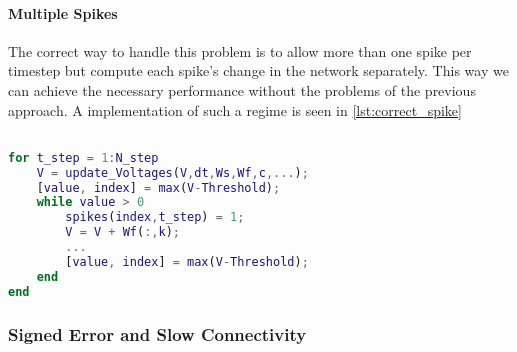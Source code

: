 \paragraph{Multiple Spikes}
The correct way to handle this problem is to allow more than one spike per timestep but compute each spike's change in the network separately. This way we can achieve the necessary performance without the problems of the previous approach. A implementation of such a regime is seen in \cref{lst:correct_spike}

\begin{lstlisting}[language=Matlab, caption=Letting each neurons spike as many times a necessary while computing each spike's influence sequentially.,label=lst:correct_spike]

for t_step = 1:N_step
	V = update_Voltages(V,dt,Ws,Wf,c,...);
	[value, index] = max(V-Threshold);
	while value > 0
		spikes(index,t_step) = 1;
		V = V + Wf(:,k);
		...
		[value, index] = max(V-Threshold);
	end
end
\end{lstlisting}

\subsubsection{Signed Error and Slow Connectivity}
